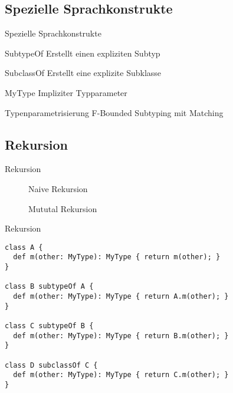 \subsection{Spezielle Sprachkonstrukte}
\begin{frame}{Spezielle Sprachkonstrukte}
	\begin{bigdescription}[<+->]{3mm}
		\item[SubtypeOf] Erstellt einen expliziten Subtyp

		\item[SubclassOf] Erstellt eine explizite Subklasse

		\item[MyType] Impliziter Typparameter

		\item[Typenparametrisierung] F-Bounded Subtyping mit Matching
	\end{bigdescription}
\end{frame}

\subsection{Rekursion}
\begin{frame}[c]{Rekursion}
	\begin{figure}
		\caption{Naive Rekursion}
	\end{figure}
	\begin{figure}
		\caption{Mututal Rekursion}
	\end{figure}
\end{frame}

\begin{frame}[c,fragile]{Rekursion}
\begin{lstlisting}[language=ooplss]
class A {
  def m(other: MyType): MyType { return m(other); }
}

class B subtypeOf A {
  def m(other: MyType): MyType { return A.m(other); }
}

class C subtypeOf B {
  def m(other: MyType): MyType { return B.m(other); }
}

class D subclassOf C {
  def m(other: MyType): MyType { return C.m(other); }
}
\end{lstlisting}
\end{frame}

